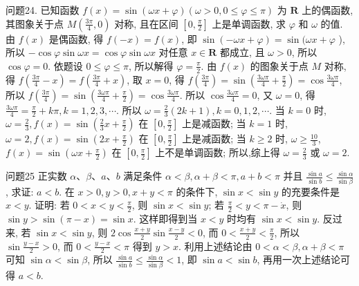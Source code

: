 问题24. 已知函数 $f(x)=\sin (\omega x+\varphi)(\omega>0,0 \leqslant \varphi \leqslant \pi)$ 为 $\mathbf{R}$ 上的偶函数, 其图象关于点 $M\left(\frac{3 \pi}{4}, 0\right)$ 对称, 且在区间 $\left[0, \frac{\pi}{2}\right]$ 上是单调函数, 求 $\varphi$ 和 $\omega$ 的值.
由 $f(x)$ 是偶函数, 得 $f(-x)=f(x)$, 即 $\sin (-\omega x+\varphi)=\sin (\omega x+ \varphi$ ), 所以 $-\cos \varphi \sin \omega x=\cos \varphi \sin \omega x$ 对任意 $x \in \mathbf{R}$ 都成立, 且 $\omega>0$, 所以 $\cos \varphi=0$. 依题设 $0 \leqslant \varphi \leqslant \pi$, 所以解得 $\varphi=\frac{\pi}{2}$. 由 $f(x)$ 的图象关于点 $M$ 对称, 得 $f\left(\frac{3 \pi}{4}-x\right)=f\left(\frac{3 \pi}{4}+x\right)$, 取 $x=0$, 得 $f\left(\frac{3 \pi}{4}\right)=\sin \left(\frac{3 \omega \pi}{4}+\frac{\pi}{2}\right)= \cos \frac{3 \omega \pi}{4}$, 所以 $f\left(\frac{3 \pi}{4}\right)=\sin \left(\frac{3 \omega \pi}{4}+\frac{\pi}{2}\right)=\cos \frac{3 \omega \pi}{4}$. 所以 $\cos \frac{3 \omega \pi}{4}=0$, 又 $\omega=0$, 得 $\frac{3 \omega \pi}{4}=\frac{\pi}{2}+k \pi, k=1,2,3, \cdots$. 所以 $\omega=\frac{2}{3}(2 k+1), k=0,1,2, \cdots$. 当 $k=0$ 时, $\omega=\frac{2}{3}, f(x)=\sin \left(\frac{2}{3} x+\frac{\pi}{2}\right)$ 在 $\left[0, \frac{\pi}{2}\right]$ 上是减函数; 当 $k=1$ 时, $\omega=2, f(x)=\sin \left(2 x+\frac{\pi}{2}\right)$ 在 $\left[0, \frac{\pi}{2}\right]$ 上是减函数; 当 $k \geqslant 2$ 时, $\omega \geqslant \frac{10}{3}$, $f(x)=\sin \left(\omega x+\frac{\pi}{2}\right)$ 在 $\left[0, \frac{\pi}{2}\right]$ 上不是单调函数; 所以,综上得 $\omega=\frac{2}{3}$ 或 $\omega=2$.



问题25 正实数 $\alpha 、 \beta 、 a 、 b$ 满足条件 $\alpha<\beta, \alpha+\beta<\pi, a+b<\pi$ 并且 $\frac{\sin a}{\sin b} \leqslant \frac{\sin \alpha}{\sin \beta}$, 求证: $a<b$.
在 $x>0, y>0, x+y<\pi$ 的条件下, $\sin x<\sin y$ 的充要条件是 $x<y$. 证明: 若 $0<x<y<\frac{\pi}{2}$, 则 $\sin x<\sin y$; 若 $\frac{\pi}{2}<y<\pi-\dot{x}$, 则 $\sin y>\sin (\pi-x)=\sin x$. 这样即得到当 $x<y$ 时均有 $\sin x<\sin y$. 反过来, 若 $\sin x<\sin y$, 则 $2 \cos \frac{x+y}{2} \sin \frac{x-y}{2}<0$, 而 $0<\frac{x+y}{2}<\frac{\pi}{2}$, 所以 $\sin \frac{y-x}{2}>0$, 而 $0<\frac{y-x}{2}<\pi$ 得到 $y>x$. 利用上述结论由 $0<\alpha<\beta, \alpha+\beta<\pi$ 可知 $\sin \alpha<\sin \beta$, 所以 $\frac{\sin a}{\sin b} \leqslant \frac{\sin \alpha}{\sin \beta}<1$, 即 $\sin a<\sin b$, 再用一次上述结论可得 $a<b$.



